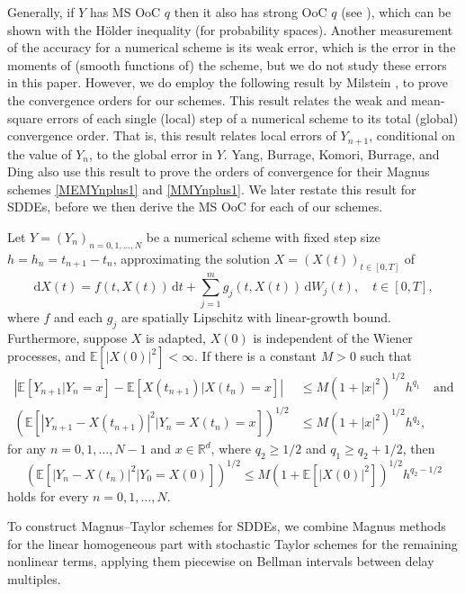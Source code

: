 \documentclass[onefignum]{siamart250211}
\providecommand{\abs}[1]{\left|#1\right|}
\begin{document}
Generally, if $Y$ has MS OoC $q$ then it also has strong OoC $q$ (see \cite[page 5]{MilsteinTretyakov2021}), which can be shown with the H\"older inequality (for probability spaces). Another measurement of the accuracy for a numerical scheme is its weak error, which is the error in the moments of (smooth functions of) the scheme, but we do not study these errors in this paper. However, we do employ the following result by Milstein \cite{Milstein1995}, to prove the convergence orders for our schemes. This result relates the weak and mean-square errors of each single (local) step of a numerical scheme to its total (global) convergence order. That is, this result relates local errors of $Y_{n+1}$, conditional on the value of $Y_n$, to the global error in $Y$. Yang, Burrage, Komori, Burrage, and Ding \cite{BurrageBurrage2021} also use this result to prove the orders of convergence for their Magnus schemes \cref{MEMYnplus1} and \cref{MMYnplus1}. We later restate this result for SDDEs, before we then derive the MS OoC for each of our schemes.

\begin{theorem}\label{GeneralTheoremofMilstein}
Let $Y=(Y_n)_{n=0,1,\ldots,N}$ be a numerical scheme with fixed step size $h=h_n=t_{n+1}-t_n$, approximating the solution $X=(X(t))_{t\in[0,T]}$ of
\[\mathrm{d}X(t)=f(t,X(t))\,\mathrm{d}t+\sum_{j=1}^mg_j(t,X(t))\,\mathrm{d}W_j(t),\quad t\in[0,T],\]
where $f$ and each $g_j$ are spatially Lipschitz with linear-growth bound. Furthermore, suppose $X$ is adapted, $X(0)$ is independent of the Wiener processes, and $\mathbb{E}[\abs{X(0)}^2]<\infty$. If there is a constant $M>0$ such that
\begin{align*}
\abs{\mathbb{E}[Y_{n+1}|Y_n=x]-\mathbb{E}[X(t_{n+1})|X(t_n)=x]}&\leqslant M\left(1+\abs{x}^2\right)^{1/2}h^{q_1}\quad\textrm{and}\\
\left(\mathbb{E}\left[\abs{Y_{n+1}-X(t_{n+1})}^2|Y_n=X(t_n)=x\right]\right)^{1/2}&\leqslant M\left(1+\abs{x}^2\right)^{1/2}h^{q_2},
\end{align*}
for any $n=0,1,\ldots,N-1$ and $x\in\mathbb{R}^d$, where $q_2\geqslant 1/2$ and $q_1\geqslant q_2+1/2$, then
\begin{equation}\left(\mathbb{E}\left[\abs{Y_n-X(t_n)}^2|Y_0=X(0)\right]\right)^{1/2}\leqslant M\left(1+\mathbb{E}\left[\abs{X(0)}^2\right]\right)^{1/2}h^{q_2-1/2}\label{MSBound}\end{equation}
holds for every $n=0,1,\ldots,N$.
\end{theorem}

To construct Magnus–Taylor schemes for SDDEs, we combine Magnus methods for the linear homogeneous part with stochastic Taylor schemes for the remaining nonlinear terms, applying them piecewise on Bellman intervals between delay multiples.
\end{document}

